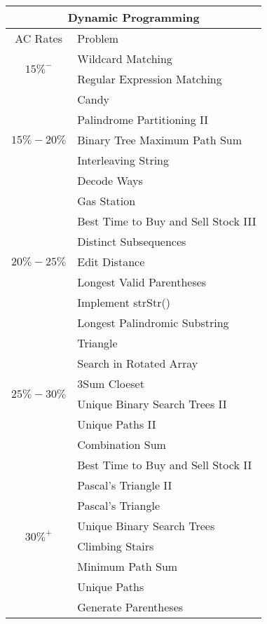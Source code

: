 \documentclass[paper=a4, fontsize=11pt]{scrartcl} %
\begin{document}
\begin{center}
  \pagebreak

  \begin{tabular}{|c|l|}
      \hline
      \multicolumn{2}{|c|}{Dynamic Programming} \\
      \hline
      AC Rates      &   Problem     \\
      \hline
      \multirow{2}{*}{$15\%^-$}  &   Wildcard Matching\\
          & Regular Expression Matching\\
      \hline
      \multirow{5}{*}{$15\%-20\%$}  &   Candy\\
          & Palindrome Partitioning II  \\
          & Binary Tree Maximum Path Sum \\
          & Interleaving String\\
          & Decode Ways\\
      \hline
      \multirow{7}{*}{$20\%-25\%$}  &   Gas Station    \\
          & Best Time to Buy and Sell Stock III\\
          & Distinct Subsequences \\
          & Edit Distance\\
          & Longest Valid Parentheses\\
          & Implement strStr()\\
          & Longest Palindromic Substring\\

      \multirow{6}{*}{$25\%-30\%$}  &   Triangle\\
          & Search in Rotated Array\\
          & 3Sum Cloeset\\
          & Unique Binary Search Trees II\\
          & Unique Paths II\\
          & Combination Sum\\
      \hline
      \multirow{8}{*}{$30\%^+$}  &   Best Time to Buy and Sell Stock II \\
          & Pascal's Triangle II \\
          & Pascal's Triangle \\
          & Unique Binary Search Trees \\
          & Climbing Stairs\\
          & Minimum Path Sum\\
          & Unique Paths\\
          & Generate Parentheses\\
      \hline
  \end{tabular}

\end{center}
\end{document}
